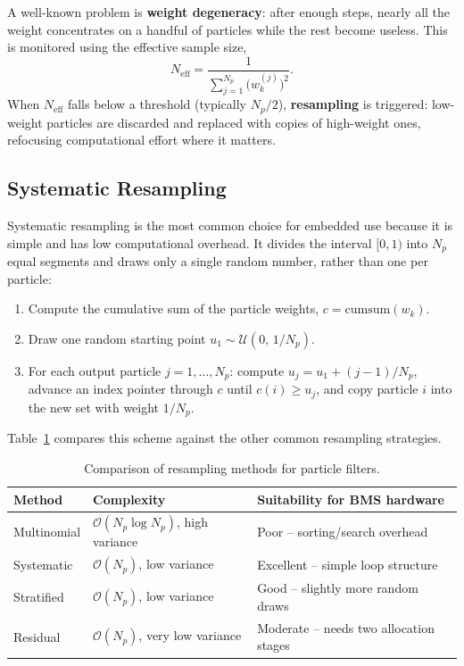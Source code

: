 A well-known problem is \textbf{weight degeneracy}: after enough steps, nearly all the weight concentrates on a handful of particles while the rest become useless. This is monitored using the effective sample size,
\begin{equation}
N_{\text{eff}} = \frac{1}{\sum_{j=1}^{N_p} \big(w_k^{(j)}\big)^2}.
\end{equation}
When $N_{\text{eff}}$ falls below a threshold (typically $N_p/2$), \textbf{resampling} is triggered: low-weight particles are discarded and replaced with copies of high-weight ones, refocusing computational effort where it matters.

\subsection{Systematic Resampling}
\label{subsec:ch5_resampling}

Systematic resampling is the most common choice for embedded use because it is simple and has low computational overhead. It divides the interval $[0,1)$ into $N_p$ equal segments and draws only a single random number, rather than one per particle:

\begin{enumerate}
    \item Compute the cumulative sum of the particle weights, $c = \mathrm{cumsum}(w_k)$.
    \item Draw one random starting point $u_1 \sim \mathcal{U}(0,\, 1/N_p)$.
    \item For each output particle $j = 1, \dots, N_p$: compute $u_j = u_1 + (j-1)/N_p$, advance an index pointer through $c$ until $c(i) \geq u_j$, and copy particle $i$ into the new set with weight $1/N_p$.
\end{enumerate}

Table~\ref{tab:resampling_comparison} compares this scheme against the other common resampling strategies.

\begin{table}[htbp]
\centering
\caption{Comparison of resampling methods for particle filters.}
\label{tab:resampling_comparison}
\footnotesize
\begin{tabularx}{\textwidth}{
    >{\raggedright\arraybackslash}p{2.4cm}
    >{\raggedright\arraybackslash}p{2.2cm}
    >{\raggedright\arraybackslash}X
}
\toprule
\textbf{Method} & \textbf{Complexity} & \textbf{Suitability for BMS hardware} \\
\midrule
Multinomial & $\mathcal{O}(N_p \log N_p)$, high variance & Poor -- sorting/search overhead \\
Systematic & $\mathcal{O}(N_p)$, low variance & Excellent -- simple loop structure \\
Stratified & $\mathcal{O}(N_p)$, low variance & Good -- slightly more random draws \\
Residual & $\mathcal{O}(N_p)$, very low variance & Moderate -- needs two allocation stages \\
\bottomrule
\end{tabularx}
\end{table}

